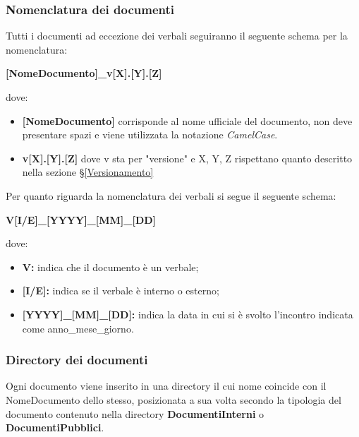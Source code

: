 \subsubsection{Nomenclatura dei documenti} \label{NomenclaturaDoc}
Tutti i documenti ad eccezione dei verbali seguiranno il seguente schema per la nomenclatura:
\begin{center}
	\textbf{[NomeDocumento]\_v[X].[Y].[Z]}
\end{center}
dove:
\begin{itemize}
	\item \textbf{[NomeDocumento]} corrisponde al nome ufficiale del documento, non deve presentare spazi e viene utilizzata la notazione \textit{CamelCase}.
	\item \textbf{v[X].[Y].[Z]} dove v sta per "versione" e X, Y, Z rispettano quanto descritto nella sezione \S\ref{Versionamento}
\end{itemize}
Per quanto riguarda la nomenclatura dei verbali si segue il seguente schema:
\begin{center}
	\textbf{V[I/E]\_[YYYY]\_[MM]\_[DD]}
\end{center}
dove:
\begin{itemize}
	\item \textbf{V:} indica che il documento è un verbale;
	\item \textbf{[I/E]:} indica se il verbale è interno o esterno;
	\item \textbf{[YYYY]\_[MM]\_[DD]:} indica la data in cui si è svolto l'incontro indicata come anno\_mese\_giorno.
\end{itemize}

\subsubsection{Directory dei documenti}
Ogni documento viene inserito in una directory il cui nome coincide con il NomeDocumento dello stesso, posizionata a sua volta secondo la tipologia del documento contenuto nella directory \textbf{DocumentiInterni} o \textbf{DocumentiPubblici}.

